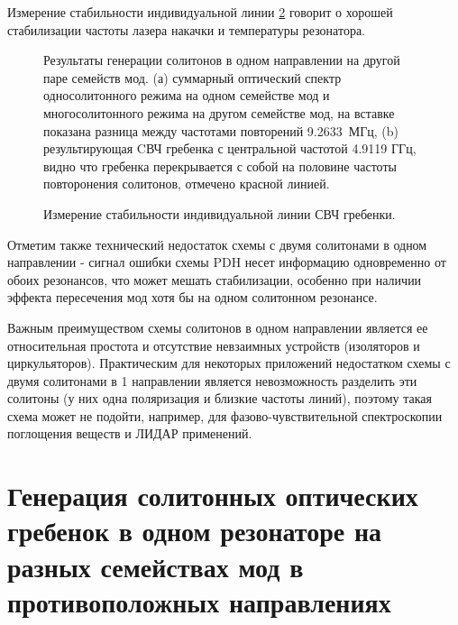 Измерение стабильности индивидуальной линии \ref{single_line_stability_cp} говорит о хорошей стабилизации частоты лазера накачки и температуры резонатора.

\begin{figure}[ht]
\begin{minipage}[ht]{1\linewidth}
\end{minipage}
\caption{Результаты генерации солитонов в одном направлении на другой паре семейств мод. (а) суммарный оптический спектр односолитонного режима на одном семействе мод и многосолитонного режима на другом семействе мод, на вставке показана разница между частотами повторений 9.2633~МГц, (b) результирующая CВЧ гребенка с центральной частотой 4.9119 ГГц, видно что гребенка перекрывается с собой на половине частоты повторонения солитонов, отмечено красной линией.}
\label{coscheme_different_types}
\end{figure}

\begin{figure}[ht]
\begin{minipage}[ht]{1\linewidth}
\end{minipage}
\caption{Измерение стабильности индивидуальной линии СВЧ гребенки.}
\label{single_line_stability_cp}
\end{figure}

Отметим также технический недостаток схемы с двумя солитонами в одном направлении - сигнал ошибки схемы PDH несет информацию одновременно от обоих резонансов, что может мешать стабилизации, особенно при наличии эффекта пересечения мод хотя бы на одном солитонном резонансе.

Важным преимуществом схемы солитонов в одном направлении является ее относительная простота и отсутствие невзаимных устройств (изоляторов и циркульяторов). Практическим для некоторых приложений недостатком схемы с двумя солитонами в 1 направлении является невозможность разделить эти солитоны (у них одна поляризация и близкие частоты линий), поэтому такая схема может не подойти, например, для фазово-чувствительной спектроскопии поглощения веществ и ЛИДАР применений.



\section{Генерация солитонных оптических гребенок в одном резонаторе на разных семействах мод в противоположных направлениях}

